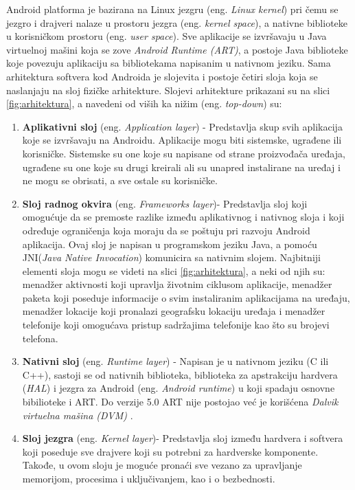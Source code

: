 \documentclass[android.tex]{subfiles}
\begin{document}
Android platforma je bazirana na Linux jezgru (eng. \textit{Linux kernel}) pri čemu se jezgro i drajveri nalaze u prostoru jezgra (eng. \textit{kernel space}), a nativne biblioteke u korisničkom prostoru (eng. \textit{user space}). Sve aplikacije se izvršavaju u Java virtuelnoj mašini koja se zove \textit{Android Runtime (ART)}, a postoje Java biblioteke koje povezuju aplikaciju sa bibliotekama napisanim u nativnom jeziku. Sama arhitektura softvera kod Androida je slojevita i postoje četiri sloja koja se naslanjaju na sloj fizičke arhitekture. Slojevi arhitekture prikazani su na slici \ref{fig:arhitektura}, a navedeni od viših ka nižim (eng. \textit{top-down}) su\cite{book:papp}:
\begin{enumerate}
\item \textbf{Aplikativni sloj} (eng. \textit{Application layer}) - Predstavlja skup svih aplikacija koje se izvršavaju na Androidu. Aplikacije mogu biti sistemske, ugrađene ili korisničke. Sistemske su one koje su napisane od strane proizvođača uređaja, ugrađene su one koje su drugi kreirali ali su unapred instalirane na uređaj i ne mogu se obrisati, a sve ostale su korisničke.
\item \textbf{Sloj radnog okvira} (eng. \textit{Frameworks layer})- Predstavlja sloj koji omogućuje da se premoste razlike između aplikativnog i nativnog sloja i koji određuje ograničenja koja moraju da se poštuju pri razvoju Android aplikacija. Ovaj sloj je napisan u programskom jeziku Java, a pomoću JNI(\textit{Java Native Invocation}) komunicira sa nativnim slojem. Najbitniji elementi sloja mogu se videti na slici \ref{fig:arhitektura}, a neki od njih su: menadžer aktivnosti koji upravlja životnim ciklusom aplikacije, menadžer paketa koji poseduje informacije o svim instaliranim aplikacijama na uređaju, menadžer lokacije koji pronalazi geografsku lokaciju uređaja i menadžer telefonije koji omogućava pristup sadržajima telefonije kao što su brojevi telefona. 
\item \textbf{Nativni sloj} (eng. \textit{Runtime layer}) - Napisan je u nativnom jeziku (C ili C++), sastoji se od nativnih biblioteka, biblioteka za apstrakciju hardvera (\textit{HAL}) i jezgra za Android (eng. \textit{Android runtime}) u koji spadaju osnovne bibilioteke i ART. Do verzije 5.0 ART nije postojao već je korišćena \textit{Dalvik virtuelna mašina (DVM)} \cite{sajt:dalvik}. 
\item \textbf{Sloj jezgra} (eng. \textit{Kernel layer})- Predstavlja sloj između hardvera i softvera koji poseduje sve drajvere koji su potrebni za hardverske komponente. Takođe, u ovom sloju je moguće pronaći sve vezano za upravljanje memorijom, procesima i uključivanjem, kao i o bezbednosti. 
\end{enumerate}
\end{document}
